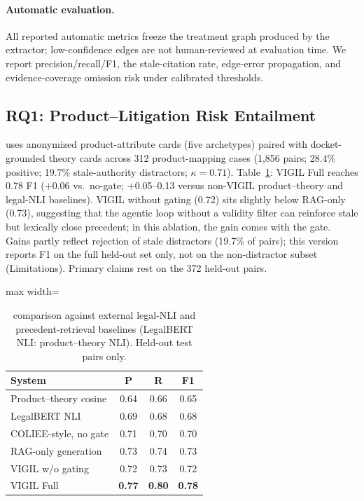 \paragraph{Automatic evaluation.}
All reported automatic metrics freeze the treatment graph produced by the extractor; low-confidence edges are not human-reviewed at evaluation time.
We report \plre{} precision/recall/F1, the stale-citation rate, edge-error propagation, and evidence-coverage omission risk under calibrated thresholds.

\subsection{RQ1: Product--Litigation Risk Entailment}
\label{sec:rq1}

\plre{} uses anonymized product-attribute cards (five archetypes) paired with docket-grounded theory cards across 312 product-mapping cases (1{,}856 pairs; 28.4\% positive; 19.7\% stale-authority distractors; $\kappa = 0.71$).
Table~\ref{tab:plre}: VIGIL Full reaches 0.78 F1 ($+$0.06 vs.\ no-gate; $+$0.05--0.13 versus non-VIGIL product--theory and legal-NLI baselines).
VIGIL without gating (0.72) sits slightly below RAG-only (0.73), suggesting that the agentic loop without a validity filter can reinforce stale but lexically close precedent; in this ablation, the \plre{} gain comes with the gate.
Gains partly reflect rejection of stale distractors (19.7\% of pairs); this version reports F1 on the full held-out set only, not on the non-distractor subset (Limitations).
Primary claims rest on the 372 held-out pairs.

\begin{table}[t]
\centering
\small
\setlength{\tabcolsep}{4pt}
\begin{adjustbox}{max width=\columnwidth}
\begin{tabular}{lccc}
\toprule
System & P & R & F1 \\
\midrule
Product--theory cosine & 0.64 & 0.66 & 0.65 \\
LegalBERT NLI & 0.69 & 0.68 & 0.68 \\
COLIEE-style, no gate & 0.71 & 0.70 & 0.70 \\
RAG-only generation & 0.73 & 0.74 & 0.73 \\
VIGIL w/o gating & 0.72 & 0.73 & 0.72 \\
VIGIL Full & \textbf{0.77} & \textbf{0.80} & \textbf{0.78} \\
\bottomrule
\end{tabular}
\end{adjustbox}
\caption{\plre{} comparison against external legal-NLI and precedent-retrieval baselines (LegalBERT NLI: product--theory NLI).
Held-out test pairs only.}
\label{tab:plre}
\end{table}

